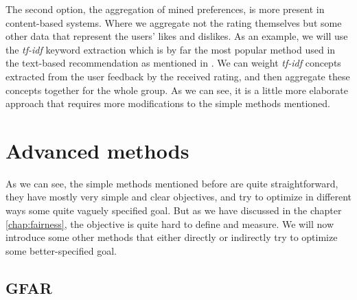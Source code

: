 The second option, the aggregation of mined preferences, is more present in content-based systems. Where we aggregate not the rating themselves but some other data that represent the users' likes and dislikes. As an example, we will use the \textit{tf-idf} keyword extraction which is by far the most popular method used in the text-based recommendation as mentioned in \cite{beel_2016_rs_literature_survey}. We can weight \textit{tf-idf} concepts extracted from the user feedback by the received rating, and then aggregate these concepts together for the whole group. As we can see, it is a little more elaborate approach that requires more modifications to the simple methods mentioned.


\section{Advanced methods}\label{sec:03_advanced_methods}
As we can see, the simple methods mentioned before are quite straightforward, they have mostly very simple and clear objectives, and try to optimize in different ways some quite vaguely specified goal. But as we have discussed in the chapter \ref{chap:fairness}, the objective is quite hard to define and measure. We will now introduce some other methods that either directly or indirectly try to optimize some better-specified goal.

\subsection{GFAR} \label{sub:03_advanced_methods.gfar}
